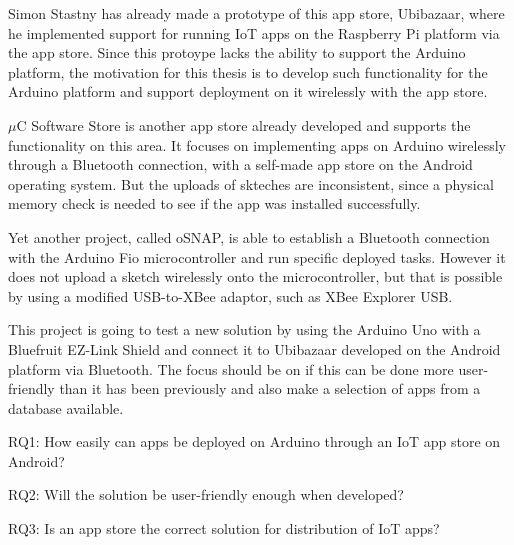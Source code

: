 Simon Stastny has already made a prototype of this app store, Ubibazaar\cite{ubibazaar}, where he implemented support for running IoT apps on the Raspberry Pi platform via the app store. Since this protoype lacks the ability to support the Arduino platform, the motivation for this thesis is to develop such functionality for the Arduino platform and support deployment on it wirelessly with the app store.

\(\mu\)C Software Store\cite{mucstore} is another app store already developed and supports the functionality on this area. It focuses on implementing apps on Arduino wirelessly through a Bluetooth connection, with a self-made app store on the Android operating system. But the uploads of skteches are inconsistent, since a physical memory check is needed to see if the app was installed successfully.

Yet another project, called oSNAP\cite{osnap}, is able to establish a Bluetooth connection with the Arduino Fio microcontroller and run specific deployed tasks. However it does not upload a sketch wirelessly onto the microcontroller, but that is possible by using a modified USB-to-XBee adaptor, such as XBee Explorer USB.\cite{arduinofio} 

This project is going to test a new solution by using the Arduino Uno with a Bluefruit EZ-Link Shield\cite{shield} and connect it to Ubibazaar developed on the Android platform via Bluetooth. The focus should be on if this can be done more user-friendly than it has been previously and also make a selection of apps from a database available.

RQ1: How easily can apps be deployed on Arduino through an IoT app store on Android?

RQ2: Will the solution be user-friendly enough when developed?

RQ3: Is an app store the correct solution for distribution of IoT apps?
